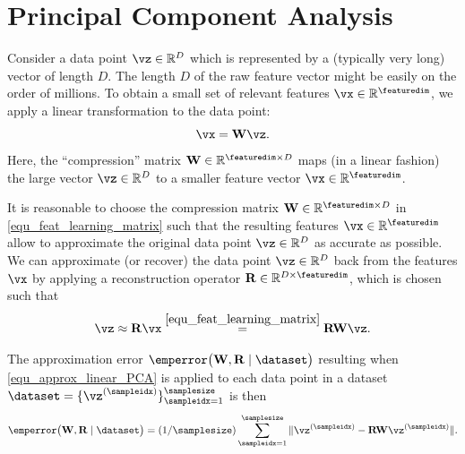 \documentclass[12pt]{report}
\begin{document}
\section{Principal Component Analysis} 
\label{sec_pca}

Consider a data point $\vz \in \mathbb{R}^{D}$ which is represented by a (typically very long) 
vector of length $D$. The length $D$ of the raw feature vector might be easily on the order of 
millions. To obtain a small set of relevant features $\vx \in \mathbb{R}^{\featuredim}$, we apply 
a linear transformation to the data point: 
\begin{equation} 
\label{equ_feat_learning_matrix}
\vx = \mathbf{W} \vz.
\end{equation}
Here, the ``compression'' matrix $\mathbf{W} \in \mathbb{R}^{\featuredim \times D}$ maps 
(in a linear fashion) the large vector $\vz \in \mathbb{R}^{D}$ to a smaller feature vector $\vx \in \mathbb{R}^{\featuredim}$. %


It is reasonable to choose the compression matrix $\mathbf{W} \in \mathbb{R}^{\featuredim \times D}$ 
in \eqref{equ_feat_learning_matrix} such that the resulting features $\vx \in \mathbb{R}^{\featuredim}$ 
allow to approximate the original data point $\vz \in \mathbb{R}^{D}$ as accurate as possible. We can 
approximate (or recover) the data point $\vz \in \mathbb{R}^{D}$ back from the features $\vx$ by 
applying a reconstruction operator $\mathbf{R} \in \mathbb{R}^{D \times \featuredim}$, which is 
chosen such that 
\begin{equation} 
\label{equ_approx_linear_PCA}
\vz \approx \mathbf{R} \vx \stackrel{\eqref{equ_feat_learning_matrix}}{=} \mathbf{R} \mathbf{W} \vz. 
\end{equation} 

The approximation error $\emperror \big( \mathbf{W},\mathbf{R} \mid \dataset\big)$ resulting 
when \eqref{equ_approx_linear_PCA} is applied to each data point in a 
dataset $\dataset=  \{ \vz^{(\sampleidx)}\}_{\sampleidx=1}^{\samplesize}$ is then
\begin{equation} 
\label{equ_app_error_PCA}
\emperror \big( \mathbf{W},\mathbf{R} \mid \dataset\big) = (1/\samplesize) \sum_{\sampleidx=1}^{\samplesize} \| \vz^{(\sampleidx)} - \mathbf{R} \mathbf{W} \vz^{(\sampleidx)} \|. 
\end{equation} 
\end{document}
